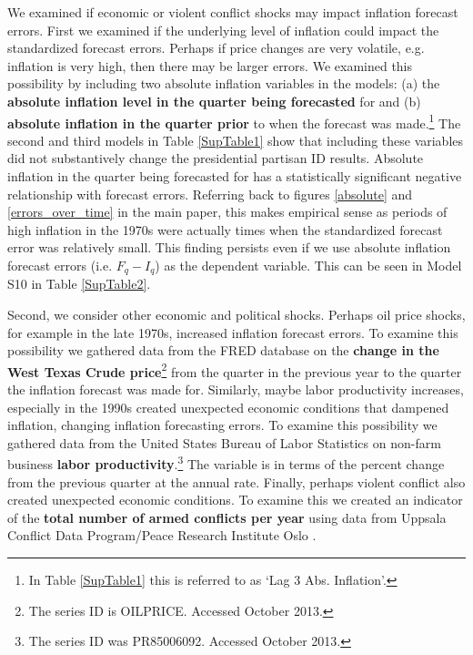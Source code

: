 \documentclass[a4paper]{article}\usepackage[]{graphicx}\usepackage[]{color}
\begin{document}
We examined if economic or violent conflict shocks may impact inflation forecast errors. First we examined if the underlying level of inflation could impact the standardized forecast errors. Perhaps if price changes are very volatile, e.g. inflation is very high, then there may be larger errors. We examined this possibility by including two absolute inflation variables in the models: (a) the \textbf{absolute inflation level in the quarter being forecasted} for and (b) \textbf{absolute inflation in the quarter prior} to when the forecast was made.\footnote{In Table \ref{SupTable1} this is referred to as `Lag 3 Abs. Inflation'.} The second and third models in Table \ref{SupTable1} show that including these variables did not substantively change the presidential partisan ID results. Absolute inflation in the quarter being forecasted for has a statistically significant negative relationship with forecast errors. Referring back to figures \ref{absolute} and \ref{errors_over_time} in the main paper, this makes empirical sense as periods of high inflation in the 1970s were actually times when the standardized forecast error was relatively small. This finding persists even if we use absolute inflation forecast errors (i.e. $F_{q} - I_{q}$) as the dependent variable. This can be seen in Model S10 in Table \ref{SupTable2}.

Second, we consider other economic and political shocks. Perhaps oil price shocks, for example in the late 1970s, increased inflation forecast errors. To examine this possibility we gathered data from the FRED database on the \textbf{change in the West Texas Crude price}\footnote{The series ID is OILPRICE. Accessed October 2013.} from the quarter in the previous year to the quarter the inflation forecast was made for. Similarly, maybe labor productivity increases, especially in the 1990s created unexpected economic conditions that dampened inflation, changing inflation forecasting errors. To examine this possibility we gathered data from the United States Bureau of Labor Statistics on non-farm business \textbf{labor productivity}.\footnote{The series ID was PR85006092. Accessed October 2013.} The variable is in terms of the percent change from the previous quarter at the annual rate. Finally, perhaps violent conflict also created unexpected economic conditions. To examine this we created an indicator of the \textbf{total number of armed conflicts per year} using data from Uppsala Conflict Data Program/Peace Research Institute Oslo \citep{Harbom2012,Gleditsch2002}. 
\end{document}
